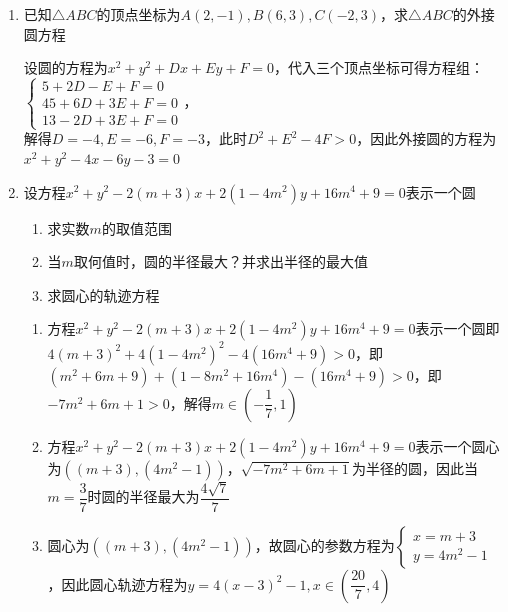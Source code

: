 \begin{enumerate}
\begin{jieda}
\begin{dingautolist}{172}
            $\therefore$ 圆心坐标为(-2, - 4),半径为 5 .
        \end{dingautolist}        
    \end{jieda}
    \item 已知$\triangle ABC$的顶点坐标为$A(2, -1), B(6, 3), C(-2, 3)$，求$\triangle ABC$的外接圆方程
    \begin{jieda}
        设圆的方程为$x^2+y^2+Dx + Ey+F = 0$，代入三个顶点坐标可得方程组：\\
        $\left\{\begin{array}{l}
             5+2D-E+F = 0  \\
             45+6D+3E+F=0 \\
             13-2D+3E+F = 0
        \end{array} \right.$，\\
        解得$D =-4, E = -6, F = -3$，此时$D^2+E^2-4F > 0$，因此外接圆的方程为$x^2+y^2-4x-6y-3=0$
    \end{jieda}
    \item 设方程$x^2+y^2-2(m+3)x+2(1-4m^2)y+16m^4+9=0$表示一个圆
    \begin{enumerate}
        \item 求实数$m$的取值范围
        \item 当$m$取何值时，圆的半径最大？并求出半径的最大值
        \item 求圆心的轨迹方程
    \end{enumerate}
    \begin{jieda}
        \begin{enumerate}
            \item 方程$x^2+y^2-2(m+3)x+2(1-4m^2)y+16m^4+9=0$表示一个圆即$4(m+3)^2+4(1-4m^2)^2-4(16m^4+9)>0$，即$(m^2+6m+9)+(1-8m^2+16m^4)-(16m^4+9) > 0$，即$-7m^2+6m+1>0$，解得$m \in \left(-\dfrac{1}{7}, 1\right)$
            \item 方程$x^2+y^2-2(m+3)x+2(1-4m^2)y+16m^4+9=0$表示一个圆心为$\left((m+3), (4m^2-1)\right)$，$\sqrt{-7m^2+6m+1}$为半径的圆，因此当$m = \dfrac{3}{7}$时圆的半径最大为$\dfrac{4\sqrt{7}}{7}$
            \item 圆心为$\left((m+3), (4m^2-1)\right)$，故圆心的参数方程为$\left\{\begin{array}{l}
                 x = m+3 \\
                 y = 4m^2-1
            \end{array}\right.$，因此圆心轨迹方程为$y = 4(x-3)^2-1, x \in \left(\dfrac{20}{7}, 4\right)$
        \end{enumerate}
    \end{jieda}
\end{enumerate}
